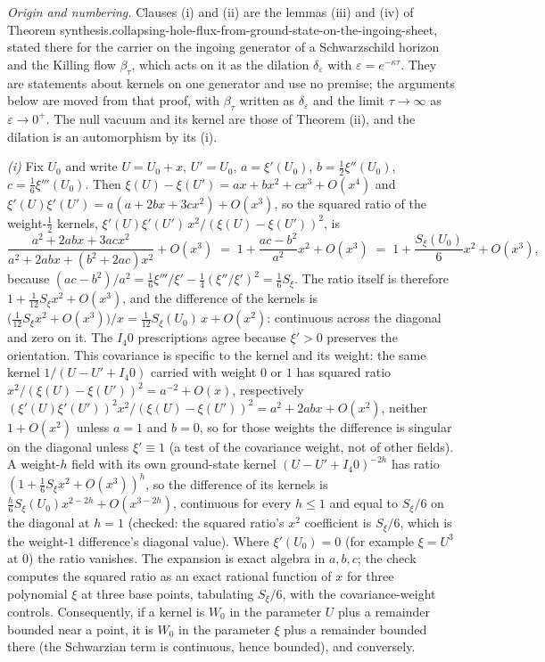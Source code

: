 \emph{Origin and numbering.} Clauses (i) and (ii) are the lemmas (iii) and (iv) of Theorem synthesis.collapsing-hole-flux-from-ground-state-on-the-ingoing-sheet, stated there for the carrier on the ingoing generator of a Schwarzschild horizon and the Killing flow $\beta_{\tau}$, which acts on it as the dilation $\delta_{\varepsilon}$ with $\varepsilon = e^{-\kappa\tau}$. They are statements about kernels on one generator and use no premise; the arguments below are moved from that proof, with $\beta_{\tau}$ written as $\delta_{\varepsilon}$ and the limit $\tau \to \infty$ as $\varepsilon \to 0^{+}$. The null vacuum and its kernel are those of Theorem (ii), and the dilation is an automorphism by its (i).

\emph{(i)} Fix $U_{0}$ and write $U = U_{0} + x$, $U' = U_{0}$, $a = \xi'(U_{0})$, $b = \tfrac12\xi''(U_{0})$, $c = \tfrac16\xi'''(U_{0})$. Then $\xi(U) - \xi(U') = ax + bx^{2} + cx^{3} + O(x^{4})$ and $\xi'(U)\xi'(U') = a(a + 2bx + 3cx^{2}) + O(x^{3})$, so the squared ratio of the weight-$\tfrac12$ kernels, $\xi'(U)\xi'(U')\,x^{2}/(\xi(U) - \xi(U'))^{2}$, is
\[
\frac{a^{2} + 2abx + 3acx^{2}}{a^{2} + 2abx + (b^{2} + 2ac)x^{2}} + O(x^{3}) \;=\; 1 + \frac{ac - b^{2}}{a^{2}}x^{2} + O(x^{3}) \;=\; 1 + \frac{S_{\xi}(U_{0})}{6}x^{2} + O(x^{3}),
\]
because $(ac - b^{2})/a^{2} = \tfrac16\xi'''/\xi' - \tfrac14(\xi''/\xi')^{2} = \tfrac16 S_{\xi}$. The ratio itself is therefore $1 + \tfrac{1}{12}S_{\xi}x^{2} + O(x^{3})$, and the difference of the kernels is $\bigl(\tfrac{1}{12}S_{\xi}x^{2} + O(x^{3})\bigr)/x = \tfrac{1}{12}S_{\xi}(U_{0})\,x + O(x^{2})$: continuous across the diagonal and zero on it. The $I_{4}0$ prescriptions agree because $\xi' > 0$ preserves the orientation. This covariance is specific to the kernel and its weight: the same kernel $1/(U - U' + I_{4}0)$ carried with weight $0$ or $1$ has squared ratio $x^{2}/(\xi(U) - \xi(U'))^{2} = a^{-2} + O(x)$, respectively $(\xi'(U)\xi'(U'))^{2}x^{2}/(\xi(U) - \xi(U'))^{2} = a^{2} + 2abx + O(x^{2})$, neither $1 + O(x^{2})$ unless $a = 1$ and $b = 0$, so for those weights the difference is singular on the diagonal unless $\xi' \equiv 1$ (a test of the covariance weight, not of other fields). A weight-$h$ field with its own ground-state kernel $(U - U' + I_{4}0)^{-2h}$ has ratio $(1 + \tfrac16 S_{\xi}x^{2} + O(x^{3}))^{h}$, so the difference of its kernels is $\tfrac{h}{6}S_{\xi}(U_{0})x^{2 - 2h} + O(x^{3 - 2h})$, continuous for every $h \le 1$ and equal to $S_{\xi}/6$ on the diagonal at $h = 1$ (checked: the squared ratio's $x^{2}$ coefficient is $S_{\xi}/6$, which is the weight-$1$ difference's diagonal value). Where $\xi'(U_{0}) = 0$ (for example $\xi = U^{3}$ at $0$) the ratio vanishes. The expansion is exact algebra in $a, b, c$; the check computes the squared ratio as an exact rational function of $x$ for three polynomial $\xi$ at three base points, tabulating $S_{\xi}/6$, with the covariance-weight controls. Consequently, if a kernel is $W_{0}$ in the parameter $U$ plus a remainder bounded near a point, it is $W_{0}$ in the parameter $\xi$ plus a remainder bounded there (the Schwarzian term is continuous, hence bounded), and conversely.

